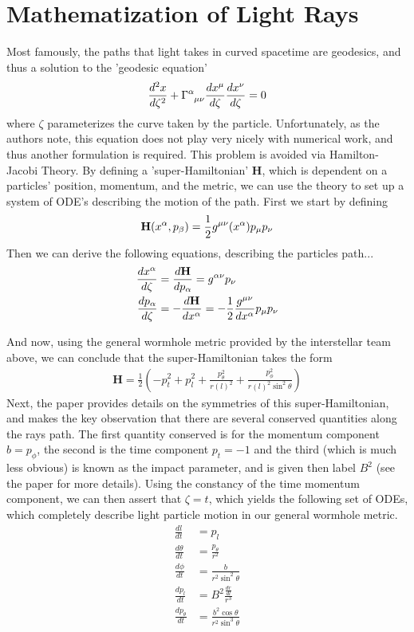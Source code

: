 \documentclass{article}
\begin{document}
\section{Mathematization of Light Rays}
Most famously, the paths that light takes in curved spacetime are geodesics, and thus a solution to the 'geodesic equation'
\begin{align*}
\frac{d^{2}x}{d\zeta^2} + \tensor{\Gamma}{^\alpha_\mu_\nu} \frac{dx^{\mu}}{d\zeta}\frac{dx^{\nu}}{d\zeta}= 0
\end{align*}
where $\zeta$ parameterizes the curve taken by the particle.
Unfortunately, as the authors note, this equation does not play very nicely with numerical work, and thus another formulation is required. This problem is avoided via Hamilton-Jacobi Theory. By defining a 'super-Hamiltonian' $\mathbf{H}$, which is dependent on a particles' position, momentum, and the metric, we can use the theory to set up a system of ODE's describing the motion of the path. First we start by defining
\begin{align*}
\mathbf{H}(x^{\alpha}, p_{\beta}) = \frac{1}{2} \tensor{g}{^\mu^\nu}(x^{\alpha})p_{\mu}p_{\nu}
\end{align*}
Then we can derive the following equations, describing the particles path...
\begin{align*}
\frac{dx^{\alpha}}{d\zeta} &= \frac{d\mathbf{H}}{dp_{\alpha}} = \tensor{g}{^\alpha^\nu}p_{\nu}\\
\frac{dp_{\alpha}}{d\zeta} &= -\frac{d\mathbf{H}}{dx^{\alpha}} = -\frac{1}{2}\frac{\tensor{g}{^\mu^\nu}}{dx^{\alpha}}   p_{\mu}p_{\nu}
\end{align*}
\par
And now, using the general wormhole metric provided by the interstellar team above, we can conclude that the super-Hamiltonian takes the form
\begin{align*}
\mathbf{H}=\frac{1}{2}(-p_{t}^2+p_{l}^2+\frac{p_{\theta}^{2}}{r(l)^2}+\frac{p_{\phi}^{2}}{r(l)^2\sin^2\theta})
\end{align*}
Next, the paper provides details on the symmetries of this super-Hamiltonian, and makes the key observation that there are several conserved quantities along the rays path. The first quantity conserved is for the momentum component $b = p_\phi$, the second is the time component $p_t=-1$ and the third (which is much less obvious) is known as the impact parameter, and is given then label $B^2$ (see the paper for more details). Using the constancy of the time momentum component, we can then assert that $\zeta = t$, which yields the following set of ODEs, which completely describe light particle motion in our general wormhole metric.
\begin{align*}
\frac{dl}{dt} &= p_l\\
\frac{d\theta}{dt} &= \frac{p_\theta}{r^2}\\
\frac{d\phi}{dt} &= \frac{b}{r^2\sin^2\theta}\\
\frac{dp_l}{dt} &= B^{2}\frac{\frac{dr}{dl}}{r^3}\\
\frac{dp_\theta}{dt} &= \frac{b^2\cos\theta}{r^2\sin^3\theta}
\end{align*}
\end{document}
